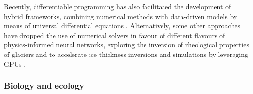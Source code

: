 Recently, differentiable programming has also facilitated the development of hybrid frameworks, combining numerical methods with data-driven models by means of universal differential equations \cite{BolibarSapienza_UDEs}. 
Alternatively, some other approaches have dropped the use of numerical solvers in favour of different flavours of physics-informed neural networks, exploring the inversion of rheological properties of glaciers \cite{wang2022discovering} and to accelerate ice thickness inversions and simulations by leveraging GPUs \cite{Jouvet_Cordonnier_Kim_Lüthi_Vieli_Aschwanden_2021, jouvet2023inversion}. 



\subsubsection{Biology and ecology}

